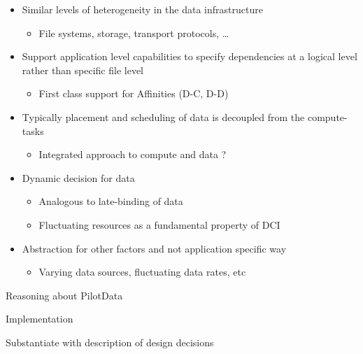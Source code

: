 \documentclass[conference]{IEEEtran}
\begin{document}
\begin{itemize}

\item Similar levels of heterogeneity in the data infrastructure

\begin{itemize}
\item File systems, storage, transport protocols, …
\end{itemize}

\item Support application level capabilities to specify dependencies
  at a logical level rather than specific file level

\begin{itemize}
\item First class support for Affinities (D-C, D-D)
\end{itemize}

\item Typically placement and scheduling of data is decoupled from the compute-tasks

\begin{itemize}
\item Integrated approach to compute and data ?
\end{itemize}

\item Dynamic decision for data

\begin{itemize}
\item Analogous  to late-binding of data
\item Fluctuating resources as a fundamental property of DCI
\end{itemize}

\item Abstraction for other factors and not application specific way
\begin{itemize}
\item Varying data sources, fluctuating data rates, etc
\end{itemize}

\end{itemize}












Reasoning about PilotData

Implementation

Substantiate with description of design decisions
\end{document}
